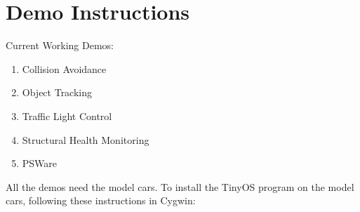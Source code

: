 \section{Demo Instructions}
\label{sec:procedure}
Current Working Demos:
\begin{enumerate}
\item Collision Avoidance \label{demo:collision}
\item Object Tracking \label{demo:tracking}
\item Traffic Light Control \label{demo:trafficLight}
\item Structural Health Monitoring \label{demo:shm}
\item PSWare \label{demo:psware}
\end{enumerate}
All the demos need the model cars. To install the TinyOS program on the model cars, following these instructions in Cygwin:

